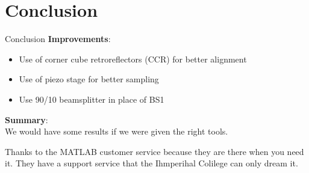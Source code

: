 \documentclass[11pt]{beamer}
\begin{document}
\section{Conclusion}
\begin{frame}{Conclusion}
\textbf{Improvements}:\\
	\begin{itemize}
		\item Use of corner cube retroreflectors (CCR) for better alignment
		\item Use of piezo stage for better sampling
		\item Use 90/10 beamsplitter in place of BS1
	\end{itemize}
	
	\vspace{5pt}
\textbf{Summary}:\\
	We would have some results if we were given the right tools.
\end{frame}
\begin{frame}
Thanks to the MATLAB customer service because they are there when you need it. They have a support service that the Ihmperihal Colilege can only dream it.
\end{frame}
\end{document}
